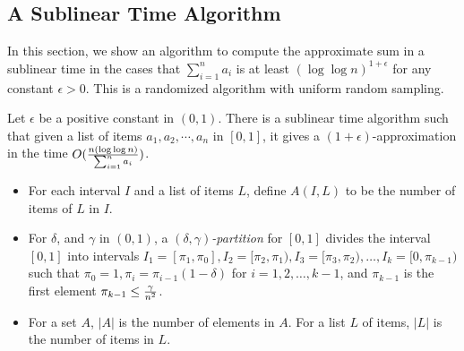 \documentclass[runningheads]{llncs}
\newcommand{\scrod}{\quad\nopagebreak}
\newcommand{\timecomplexity}{O({n(\log\log n)\over \sum_{i=1}^n a_i})}
\begin{document}
\subsection{A Sublinear Time Algorithm}

In this section, we show an algorithm to compute the approximate sum
in a sublinear time in the cases that $\sum_{i=1}^n a_i$ is at least
$(\log\log n)^{1+\epsilon}$ for any constant $\epsilon>0$. This is a
randomized algorithm with uniform random sampling.

\begin{theorem}\label{main-thm}
Let $\epsilon$ be a positive constant in $(0,1)$. There is a
sublinear time algorithm such that given  a list of items
$a_1,a_2,\cdots, a_n$ in $[0,1]$, it gives a
$(1+\epsilon)$-approximation in the time $\timecomplexity$.
\end{theorem}


\begin{definition}\label{partition-def}\scrod
\begin{itemize}
\item
For each interval $I$ and a list of items $L$, define $A(I,L)$ to be
the number of items of $L$ in $I$.

\item
For $\delta$, and $\gamma$ in $(0,1)$, a {\it
$(\delta,\gamma)$-partition} for $[0,1]$ divides the interval
$[0,1]$ into intervals $I_1=[\pi_1, \pi_0], I_2=[\pi_2, \pi_1),
I_3=[\pi_3,\pi_2),\ldots ,I_k=[0, \pi_{k-1})$
 such that $\pi_0=1,
\pi_i=\pi_{i-1}(1-\delta)$ for $i=1,2,\ldots , k-1$, and $\pi_{k-1}$
is the first element $\pi_{k-1}\le {\gamma\over n^2}$.

\item
For a set $A$, $|A|$ is the number of elements in $A$. For a list
$L$ of items, $|L|$ is the number of items in $L$.
\end{itemize}
\end{definition}
\end{document}

